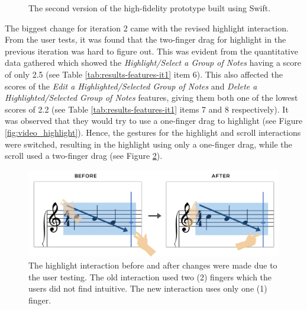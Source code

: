 				\begin{figure}[H]
					\centering
				    \caption{The second version of the high-fidelity prototype built using Swift.}
				    \label{fig:flow_it2}
				\end{figure} 

				The biggest change for iteration 2 came with the revised highlight interaction. From the user tests, it was found that the two-finger drag for highlight in the previous iteration was hard to figure out. This was evident from the quantitative data gathered which showed the \textit{Highlight/Select a Group of Notes} having a score of only 2.5 (see Table \ref{tab:results-features-it1} item 6). This also affected the scores of the \textit{Edit a Highlighted/Selected Group of Notes} and \textit{Delete a Highlighted/Selected Group of Notes} features, giving them both one of the lowest scores of 2.2 (see Table \ref{tab:results-features-it1} items 7 and 8 respectively). It was observed that they would try to use a one-finger drag to highlight (see Figure \ref{fig:video_highlight}). Hence, the gestures for the highlight and scroll interactions were switched, resulting in the highlight using only a one-finger drag, while the scroll used a two-finger drag (see Figure \ref{fig:highlight}). 

				\begin{figure}[h]
					\centering
					\includegraphics[scale=0.25]{figures/before-after-highlight.png}
				    \caption{The highlight interaction before and after changes were made due to the user testing. The old interaction used two (2) fingers which the users did not find intuitive. The new interaction uses only one (1) finger.}
				    \label{fig:highlight}
				\end{figure}

